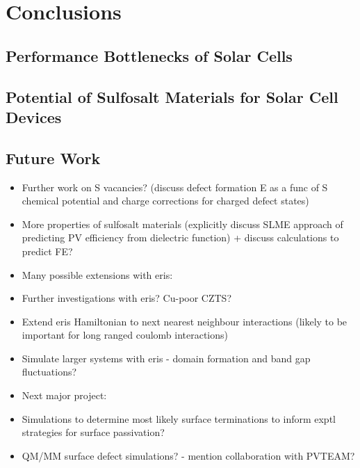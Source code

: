 
\chapter{Conclusions}

\label{ch:conclusions}

\section{Performance Bottlenecks of  {\CZTS } Solar Cells}
\section{Potential of Sulfosalt Materials for Solar Cell Devices}

\section{Future Work}

\begin{itemize}
\item Further work on S vacancies? (discuss defect formation E as a func of S chemical potential and charge corrections for charged defect states)
\item More properties of sulfosalt materials (explicitly discuss SLME approach of predicting PV efficiency from dielectric function) + discuss calculations to predict FE?
\item Many possible extensions with eris:
\item Further investigations with eris? Cu-poor CZTS?
\item Extend eris Hamiltonian to next nearest neighbour interactions (likely to be important for long ranged coulomb interactions)
\item Simulate larger systems with eris - domain formation and band gap fluctuations?
\item Next major project:
\item Simulations to determine most likely surface terminations to inform exptl strategies for surface passivation?
\item QM/MM surface defect simulations? - mention collaboration with PVTEAM?
\end{itemize}

 